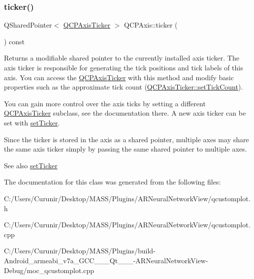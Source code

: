 \subsubsection{\texorpdfstring{ticker()}{ticker()}}
{\footnotesize\ttfamily Q\+Shared\+Pointer$<$ \hyperlink{class_q_c_p_axis_ticker}{Q\+C\+P\+Axis\+Ticker} $>$ Q\+C\+P\+Axis\+::ticker (\begin{DoxyParamCaption}{ }\end{DoxyParamCaption}) const\hspace{0.3cm}{\ttfamily [inline]}}

Returns a modifiable shared pointer to the currently installed axis ticker. The axis ticker is responsible for generating the tick positions and tick labels of this axis. You can access the \hyperlink{class_q_c_p_axis_ticker}{Q\+C\+P\+Axis\+Ticker} with this method and modify basic properties such as the approximate tick count (\hyperlink{class_q_c_p_axis_ticker_a47752abba8293e6dc18491501ae34008}{Q\+C\+P\+Axis\+Ticker\+::set\+Tick\+Count}).

You can gain more control over the axis ticks by setting a different \hyperlink{class_q_c_p_axis_ticker}{Q\+C\+P\+Axis\+Ticker} subclass, see the documentation there. A new axis ticker can be set with \hyperlink{class_q_c_p_axis_a4ee03fcd2c74d05cd1a419b9af5cfbdc}{set\+Ticker}.

Since the ticker is stored in the axis as a shared pointer, multiple axes may share the same axis ticker simply by passing the same shared pointer to multiple axes.

\begin{DoxySeeAlso}{See also}
\hyperlink{class_q_c_p_axis_a4ee03fcd2c74d05cd1a419b9af5cfbdc}{set\+Ticker} 
\end{DoxySeeAlso}


The documentation for this class was generated from the following files\+:\begin{DoxyCompactItemize}
\item 
C\+:/\+Users/\+Curunir/\+Desktop/\+M\+A\+S\+S/\+Plugins/\+A\+R\+Neural\+Network\+View/qcustomplot.\+h\item 
C\+:/\+Users/\+Curunir/\+Desktop/\+M\+A\+S\+S/\+Plugins/\+A\+R\+Neural\+Network\+View/qcustomplot.\+cpp\item 
C\+:/\+Users/\+Curunir/\+Desktop/\+M\+A\+S\+S/\+Plugins/build-\/\+Android\+\_\+armeabi\+\_\+v7a\+\_\+\+G\+C\+C\+\_\+\_\+\_\+\+Qt\+\_\+\_\+\_-\/\+A\+R\+Neural\+Network\+View-\/\+Debug/moc\+\_\+qcustomplot.\+cpp\end{DoxyCompactItemize}
